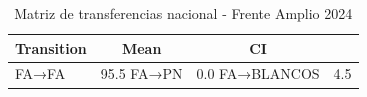 \begin{table}
\caption{Matriz de transferencias nacional - Frente Amplio 2024}
\label{tab:fa_national_2024}
\begin{tabular}{lcc}
\toprule
Transition & Mean & CI \\
\midrule
FA→FA & 95.5%
FA→PN & 0.0%
FA→BLANCOS & 4.5%
\bottomrule
\end{tabular}
\end{table}
